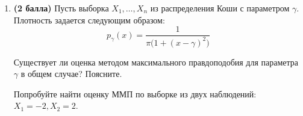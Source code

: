 \documentclass{assignment}
\begin{document}
\begin{enumerate}
    \item \textbf{(2 балла)} Пусть выборка $X_1, \ldots, X_n$ из  распределения Коши с параметром $\gamma$. 
    Плотность задается следующим образом:
    $$
    p_{\gamma}(x) = \frac{1}{\pi \big(1 + (x - \gamma)^2\big)}
    $$

    Существует ли оценка методом максимального правдоподобия для параметра $\gamma$ в общем случае? Поясните.

    Попробуйте найти оценку ММП по выборке из двух наблюдений: $X_1 = -2, X_2 = 2$.
\end{enumerate}
    
\end{document}

